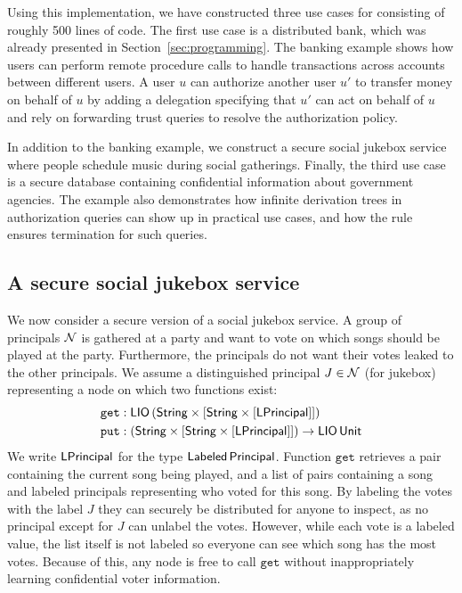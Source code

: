 Using this implementation, we have constructed three use cases for \lang{} consisting of roughly 500 lines of code. The first use case is a distributed bank, which was already presented in Section~\ref{sec:programming}. The banking example shows how users can perform remote procedure calls to handle transactions across accounts between different users. A user $u$ can authorize another user $u'$ to transfer money on behalf of $u$ by adding a delegation specifying that $u'$ can act on behalf of $u$ and rely on forwarding trust queries to resolve the authorization policy.

In addition to the banking example, we construct a secure social jukebox service where people schedule music during social gatherings. Finally, the third use case is a secure database containing confidential information about government agencies. The example also demonstrates how infinite derivation trees in authorization queries can show up in practical use cases, and how the  rule ensures termination for such queries.

\subsection{A secure social jukebox service}\label{subsec:jukebox}
We now consider a secure version of a social jukebox service. A group of principals $\mathcal{N}$ is gathered at a party and want to vote on which songs should be played at the party. Furthermore, the principals do not want their votes leaked to the other principals. We assume a distinguished principal $J \in \mathcal{N}$ (for jukebox) representing a node on which two functions exist:
\begin{align*}
\mathtt{get}&: \mathsf{LIO}\,(\mathsf{String} \times \lbrack\mathsf{String} \times \lbrack\mathsf{LPrincipal}\rbrack\rbrack)\\
\mathtt{put}&: (\mathsf{String} \times \lbrack\mathsf{String} \times \lbrack\mathsf{LPrincipal}\rbrack\rbrack) \to \mathsf{LIO}\,\mathsf{Unit}
\end{align*}
We write $\mathsf{LPrincipal}$ for the type $\mathsf{Labeled}\,\mathsf{Principal}$. Function $\mathtt{get}$ retrieves a pair containing the current song being played, and a list of pairs containing a song and labeled principals representing who voted for this song. By labeling the votes with the label $J$ they can securely be distributed for anyone to inspect, as no principal except for $J$ can unlabel the votes. However, while each vote is a labeled value, the list itself is not labeled so everyone can see which song has the most votes. Because of this, any node is free to call $\mathtt{get}$ without inappropriately learning confidential voter information.

